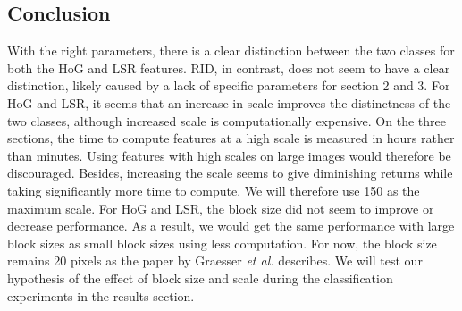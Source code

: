 \subsection{Conclusion}

With the right parameters, there is a clear distinction between the two classes for both the HoG and LSR features. RID, in contrast, does not seem to have a clear distinction, likely caused by a lack of specific parameters for section 2 and 3. For HoG and LSR, it seems that an increase in scale improves the distinctness of the two classes, although increased scale is computationally expensive. On the three sections, the time to compute features at a high scale is measured in hours rather than minutes. Using features with high scales on large images would therefore be discouraged. Besides, increasing the scale seems to give diminishing returns while taking significantly more time to compute. We will therefore use 150 as the maximum scale.
For HoG and LSR, the block size did not seem to improve or decrease performance. As a result, we would get the same performance with large block sizes as small block sizes using less computation. For now, the block size remains 20 pixels as the paper by Graesser \textit{et al.} describes. We will test our hypothesis of the effect of block size and scale during the classification experiments in the results section.


